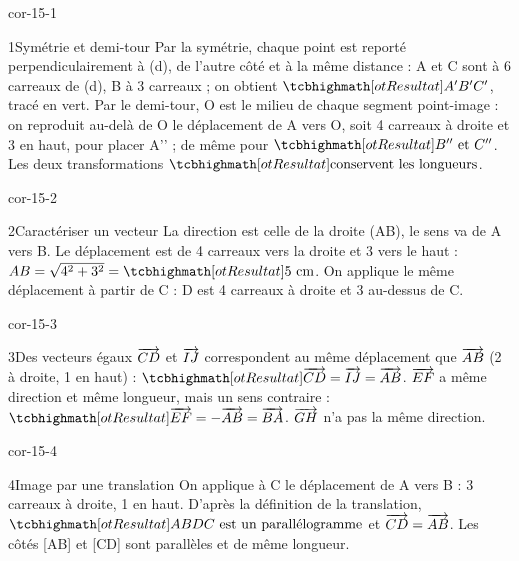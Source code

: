 \clearpage\pagestyle{otMain}\fontsize{11}{15}\selectfont{}
\begin{blocLivre}{cor-15-1}\begin{corrige}{1}{Symétrie et demi-tour}
Par la symétrie, chaque point est reporté perpendiculairement à (d), de l’autre côté et à la même distance : A et C sont à 6 carreaux de (d), B à 3 carreaux ; on obtient $\res{A'B'C'}$, tracé en vert. Par le demi-tour, O est le milieu de chaque segment point-image : on reproduit au-delà de O le déplacement de A vers O, soit 4 carreaux à droite et 3 en haut, pour placer A’’ ; de même pour $\res{B''\text{ et }C''}$. Les deux transformations $\res{\text{conservent les longueurs}}$.
\label{fig-cor-15-1}
\end{corrige}\end{blocLivre}
\begin{blocLivre}{cor-15-2}\begin{corrige}{2}{Caractériser un vecteur}
La direction est celle de la droite (AB), le sens va de A vers B. Le déplacement est de 4 carreaux vers la droite et 3 vers le haut : $AB=\sqrt{4^2+3^2}=\res{5\text{ cm}}$. On applique le même déplacement à partir de C : D est 4 carreaux à droite et 3 au-dessus de C.
\label{fig-cor-15-2}
\end{corrige}\end{blocLivre}
\begin{blocLivre}{cor-15-3}\begin{corrige}{3}{Des vecteurs égaux}
$\overrightarrow{CD}$ et $\overrightarrow{IJ}$ correspondent au même déplacement que $\overrightarrow{AB}$ (2 à droite, 1 en haut) : $\res{\vect{CD}=\vect{IJ}=\vect{AB}}$. $\overrightarrow{EF}$ a même direction et même longueur, mais un sens contraire : $\res{\vect{EF}=-\vect{AB}=\vect{BA}}$. $\overrightarrow{GH}$ n’a pas la même direction.
\label{fig-cor-15-3}
\end{corrige}\end{blocLivre}
\begin{blocLivre}{cor-15-4}\begin{corrige}{4}{Image par une translation}
On applique à C le déplacement de A vers B : 3 carreaux à droite, 1 en haut. D’après la définition de la translation, $\res{ABDC\text{ est un parallélogramme}}$ et $\overrightarrow{CD}=\overrightarrow{AB}$. Les côtés [AB] et [CD] sont parallèles et de même longueur.
\label{fig-cor-15-4}
\end{corrige}\end{blocLivre}
